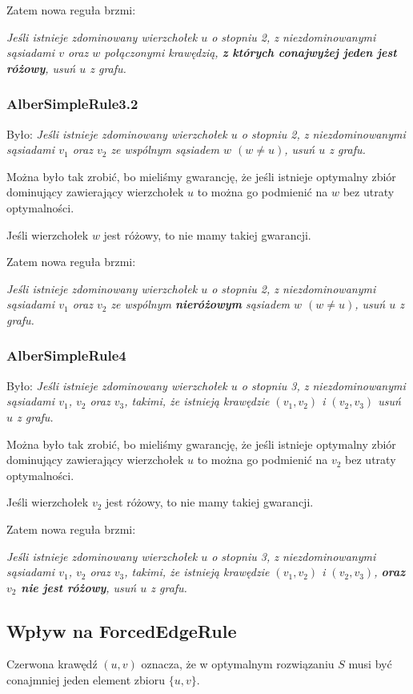 \documentclass[12pt]{article}
\begin{document}
Zatem nowa reguła brzmi:

\emph{Jeśli istnieje zdominowany wierzchołek $u$ o stopniu 2, z niezdominowanymi sąsiadami $v$ oraz $w$ połączonymi krawędzią, 
\textbf{z których conajwyżej jeden jest różowy}, usuń $u$ z grafu. }

\subsubsection{AlberSimpleRule3.2}
Było: \emph{Jeśli istnieje zdominowany wierzchołek $u$ o stopniu 2, z niezdominowanymi sąsiadami $v_1$ oraz $v_2$ ze wspólnym sąsiadem $w$ $(w \neq u)$, usuń $u$ z grafu. }

Można było tak zrobić, bo mieliśmy gwarancję, że jeśli istnieje optymalny zbiór dominujący zawierający wierzchołek $u$ to można go podmienić na $w$ bez utraty optymalności. 

Jeśli wierzchołek $w$ jest różowy, to nie mamy takiej gwarancji.

Zatem nowa reguła brzmi:

\emph{Jeśli istnieje zdominowany wierzchołek $u$ o stopniu 2, z niezdominowanymi sąsiadami $v_1$ oraz $v_2$ ze wspólnym \textbf{nieróżowym} sąsiadem $w$ $(w \neq u)$, usuń $u$ z grafu. }


\subsubsection{AlberSimpleRule4}
Było: \emph{Jeśli istnieje zdominowany wierzchołek $u$ o stopniu 3, z niezdominowanymi sąsiadami $v_1$, $v_2$ oraz $v_3$, takimi, że istnieją krawędzie $(v_1, v_2)$ i $(v_2, v_3)$ usuń $u$ z grafu. }

Można było tak zrobić, bo mieliśmy gwarancję, że jeśli istnieje optymalny zbiór dominujący zawierający wierzchołek $u$ to można go podmienić na $v_2$ bez utraty optymalności. 

Jeśli wierzchołek $v_2$ jest różowy, to nie mamy takiej gwarancji.

Zatem nowa reguła brzmi:

\emph{Jeśli istnieje zdominowany wierzchołek $u$ o stopniu 3, z niezdominowanymi sąsiadami $v_1$, $v_2$ oraz $v_3$, takimi, że istnieją krawędzie $(v_1, v_2)$ i $(v_2, v_3)$, \textbf{oraz $v_2$ nie jest różowy}, usuń $u$ z grafu. }

\subsection{Wpływ na ForcedEdgeRule}
Czerwona krawędź $(u, v)$ oznacza, że w optymalnym rozwiązaniu $S$ musi być conajmniej jeden element zbioru $\{u, v\}$.
\end{document}

